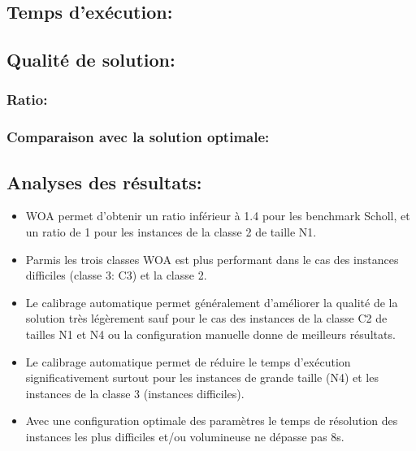 \documentclass[12pt]{article}
\begin{document}
\subsection{Temps d'exécution: }
\subsection{Qualité de solution: }
\subsubsection{Ratio: }
\subsubsection{Comparaison avec la solution optimale: }
\subsection{Analyses des résultats: }
\begin{itemize}
    \item WOA permet d'obtenir un ratio inférieur à 1.4 pour les benchmark Scholl, et un ratio de 1 pour les instances de la classe 2 de taille N1.
    \item Parmis les trois classes WOA est plus performant dans le cas des instances difficiles (classe 3: C3) et la classe 2.
    \item Le calibrage automatique permet généralement d’améliorer la qualité de la solution très légèrement sauf pour le cas des instances de la classe C2 de tailles N1 et N4 ou la configuration manuelle donne de meilleurs résultats.
    \item Le calibrage automatique permet de réduire le temps d’exécution significativement surtout pour les instances de grande taille (N4) et les instances de la classe 3 (instances difficiles).
    \item Avec une configuration optimale des paramètres le temps de résolution des instances les plus difficiles et/ou volumineuse ne dépasse pas 8s.
\end{itemize}
\end{document}
